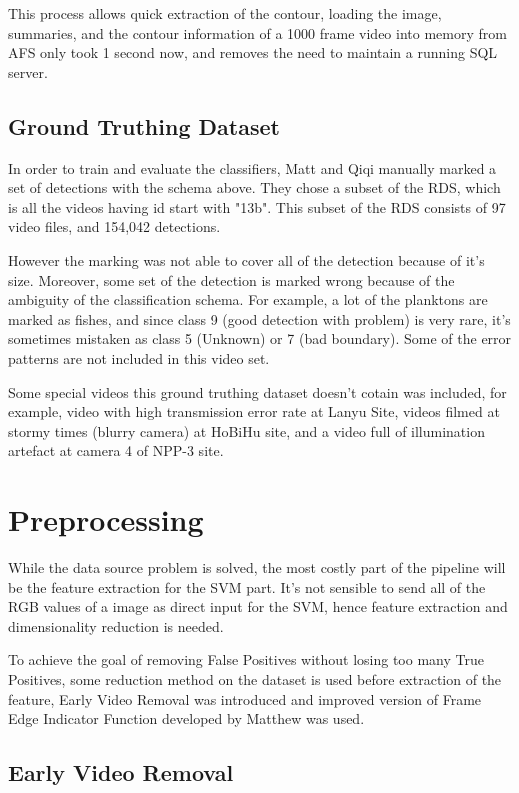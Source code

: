 \documentclass[bsc,logo,twoside,fullspacing,parskip]{infthesis}
\begin{document}
This process allows quick extraction of the contour, loading the image, summaries, and the contour information of a 1000 frame video into memory from AFS only took 1 second now, and removes the need to maintain a running SQL server.

\section{Ground Truthing Dataset}

In order to train and evaluate the classifiers, Matt and Qiqi manually marked a set of detections with the schema above. They chose a subset of the RDS, which is all the videos having id start with "13b". This subset of the RDS consists of 97 video files, and 154,042 detections. 

However the marking was not able to cover all of the detection because of it's size. Moreover, some set of the detection is marked wrong because of the ambiguity of the classification schema. For example, a lot of the planktons are marked as fishes, and since class 9 (good detection with problem) is very rare, it's sometimes mistaken as class 5 (Unknown) or 7 (bad boundary). Some of the error patterns are not included in this video set.

Some special videos this ground truthing dataset doesn't cotain was included, for example, video with high transmission error rate at Lanyu Site, videos filmed at stormy times (blurry camera) at HoBiHu site, and a video full of illumination artefact at camera 4 of NPP-3 site.


\chapter{Preprocessing}
\label{sec:prepro}

While the data source problem is solved, the most costly part of the pipeline will be the feature extraction for the SVM part. 
It's not sensible to send all of the RGB values of a image as direct input for the SVM, hence feature extraction and dimensionality reduction is needed.

To achieve the goal of removing False Positives without losing too many True Positives, some reduction method on the dataset is used before extraction of the feature, Early Video Removal was introduced and improved version of Frame Edge Indicator Function developed by Matthew was used.


\section{Early Video Removal}
\end{document}
